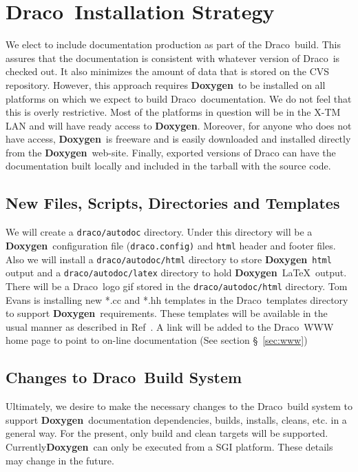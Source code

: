 \documentclass[11pt]{nmemo}
\newcommand{\draco}{{\normalfont\sffamily Draco}}
\newcommand{\doxy}{{\normalfont\bfseries Doxygen}}
\begin{document}

\section{\draco\ Installation Strategy}
\label{sec:draco}

We elect to include documentation
production as part of the \draco\ build. This assures that the
documentation is consistent with whatever version of \draco\ is
checked out. It also minimizes the amount of data that is stored on
the CVS repository. However, this approach requires
\doxy\ to be installed on all platforms on which we expect to build
\draco\ documentation.  We do not feel that this is overly restrictive.
Most of the platforms in question will be in the X-TM LAN and will have ready 
access to \doxy. Moreover, for anyone who does not
have access, \doxy\ is freeware and is easily downloaded and
installed directly from the \doxy\ web-site.
Finally, exported versions of Draco can have the documentation
built locally and included in the tarball with the source code. 

\subsection{New Files, Scripts, Directories and Templates}
We will create a \texttt{draco/autodoc} directory. Under this directory
will be a \doxy\ configuration file (\texttt{draco.config)} and
 \texttt{html} header and footer files. Also we will install 
a \texttt{draco/autodoc/html} directory to store \doxy\ \texttt{html}
output and a \texttt{draco/autodoc/latex}
directory to hold \doxy\ \LaTeX\ output. There will be a \draco\ logo gif
stored in the \texttt{draco/autodoc/html} directory. 
Tom Evans is installing new *.cc and *.hh templates in the \draco\ 
templates directory to support \doxy\ requirements. These templates
will be available in the usual manner as described in Ref~\cite{xtm:9909}.
A link will be added to the \draco\ WWW home page to point to on-line
documentation (See section \S~\ref{sec:www})

\subsection{Changes to \draco\ Build System}

Ultimately, we desire to make the necessary changes to the \draco\
build system to support \doxy\ documentation dependencies,
builds, installs, cleans,
etc. in a general way. For the present, 
only build and clean targets will be supported.
Currently\doxy\
can only be executed from a SGI platform. These details may
change in the future. 
\end{document}
